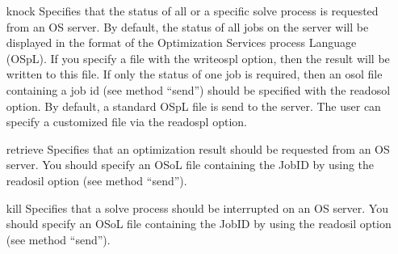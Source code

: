 \begin{description}
\begin{itemize}
\item[knock] 
Specifies that the status of all or a specific solve process is requested from an OS server.
By default, the status of all jobs on the server will be displayed in the format of the Optimization Services process Language (OSpL).
If you specify a file with the writeospl option, then the result will be written to this file.
If only the status of one job is required, then an osol file containing a job id (see method ``send'') should be specified with the readosol option.
By default, a standard OSpL file is send to the server.
The user can specify a customized file via the readospl option.

\item[retrieve] 
Specifies that an optimization result should be requested from an OS server.
You should specify an OSoL file containing the JobID by using the readosil option (see method ``send'').

\item[kill] 
Specifies that a solve process should be interrupted on an OS server.
You should specify an OSoL file containing the JobID by using the readosil option (see method ``send'').

\end{itemize}

\end{description}
